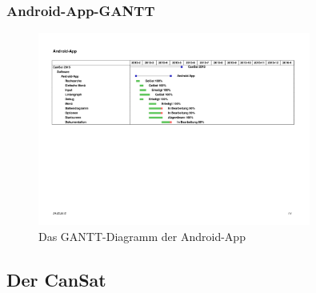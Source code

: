 \subsubsection {Android-App-GANTT}
\begin{figure}[H]
	\centering
	\includegraphics[trim = 30mm 200mm 45mm 40mm, clip,width=0.8\textwidth]{8_Anhang/android-app-gantt.png}
	\caption{Das GANTT-Diagramm der Android-App}
	\label{gantt_hardware_3}
\end{figure}

\newpage
\vspace{-2cm}
\subsection{Der CanSat}

